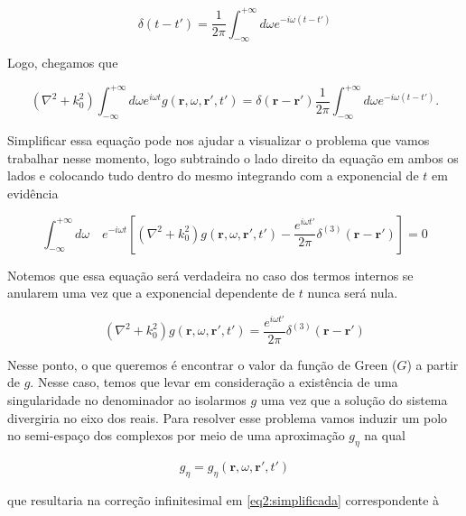 \begin{equation}
	\delta(t-t') = \frac{1}{2\pi}\int_{-\infty}^{+\infty} d\omega e^{-i\omega (t-t')}
	\label{eq2:delta}
\end{equation}

Logo, chegamos que

\begin{equation}
	\left( \nabla^2 + k_0^2\right) \int_{-\infty}^{+\infty} d\omega e^{i\omega t} g(\textbf{r},\omega, \textbf{r}', t') = \delta(\textbf{r}-\textbf{r}')\frac{1}{2\pi}\int_{-\infty}^{+\infty} d\omega e^{-i\omega (t-t')}.
\end{equation}

Simplificar essa equação pode nos ajudar a visualizar o problema que vamos trabalhar nesse momento, logo subtraindo o lado direito da equação em ambos os lados e colocando tudo dentro do mesmo integrando com a exponencial de $t$ em evidência

\begin{equation}
	\int_{-\infty}^{+\infty} d\omega \quad 
	e^{-i\omega t}
	\left[ \left( \nabla^2 + k_0^2\right) g(\textbf{r},\omega, \textbf{r}', t') 
	- \frac{e^{i\omega t'}}{2\pi}
	\delta^{(3)}(\textbf{r}-\textbf{r}')\right] = 0 
\end{equation}

Notemos que essa equação será verdadeira no caso dos termos internos se anularem uma vez que a exponencial dependente de $t$ nunca será nula.

\begin{equation}
	\left( \nabla^2 + k_0^2\right) g(\textbf{r},\omega, \textbf{r}', t') 
    = \frac{e^{i\omega t'}}{2\pi}\delta^{(3)}(\textbf{r}-\textbf{r}')
    \label{eq2:simplificada}
\end{equation}

Nesse ponto, o que queremos é encontrar o valor da função de Green ($G$) a partir de $g$. Nesse caso, temos que levar em consideração a existência de uma singularidade no denominador ao isolarmos $g$ uma vez que a solução do sistema divergiria no eixo dos reais. Para resolver esse problema vamos induzir um polo no semi-espaço dos complexos por meio de uma aproximação $g_\eta$ na qual

\begin{equation*}
	g_{\eta} = g_{\eta}(\textbf{r}, \omega, \textbf{r}', t')
\end{equation*}

que resultaria na correção infinitesimal em \ref{eq2:simplificada} correspondente à

